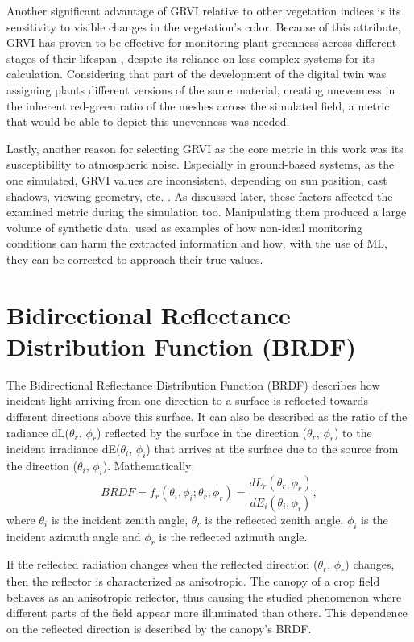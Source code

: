 Another significant advantage of GRVI relative to other vegetation indices is its sensitivity to visible changes in the vegetation's color. Because of this attribute, GRVI has proven to be effective for monitoring plant greenness across different stages of their lifespan \cite{gpp-grvi-phenology, rs-grvi-phenology}, despite its reliance on less complex systems for its calculation. Considering that part of the development of the digital twin was assigning plants different versions of the same material, creating unevenness in the inherent red-green ratio of the meshes across the simulated field, a metric that would be able to depict this unevenness was needed.

Lastly, another reason for selecting GRVI as the core metric in this work was its susceptibility to atmospheric noise. Especially in ground-based systems, as the one simulated, GRVI values are inconsistent, depending on sun position, cast shadows, viewing geometry, etc. \cite{impact_of_sunlight_conditions}. As discussed later, these factors affected the examined metric during the simulation too. Manipulating them produced a large volume of synthetic data, used as examples of how non-ideal monitoring conditions can harm the extracted information and how, with the use of ML, they can be corrected to approach their true values.

\section{Bidirectional Reflectance Distribution Function (BRDF)} \label{brdf}

The Bidirectional Reflectance Distribution Function (BRDF) describes how incident light arriving from one direction to a surface is reflected towards different directions above this surface. It can also be described as the ratio of the radiance dL($\theta_r$, $\phi_r$) reflected by the surface in the direction ($\theta_r$, $\phi_r$) to the incident irradiance dE($\theta_i$, $\phi_i$) that arrives at the surface due to the source from the direction ($\theta_i$, $\phi_i$). Mathematically:
\[
BRDF = f_r(\theta_i, \phi_i; \theta_r, \phi_r) = \frac{dL_r(\theta_r, \phi_r)}{ dE_i(\theta_i, \phi_i)},
\]
where $\theta_i$ is the incident zenith angle, $\theta_r$ is the reflected zenith angle, $\phi_i$ is the incident azimuth angle and $\phi_r$ is the reflected azimuth angle.

If the reflected radiation changes when the reflected direction ($\theta_r$, $\phi_r$) changes, then the reflector is characterized as anisotropic. The canopy of a crop field behaves as an anisotropic reflector, thus causing the studied phenomenon where different parts of the field appear more illuminated than others. This dependence on the reflected direction is described by the canopy's BRDF.

